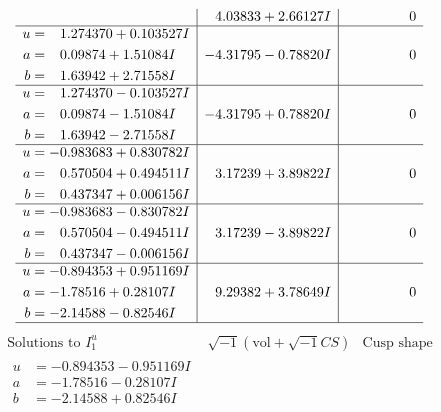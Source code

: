 \documentclass[1p]{elsarticle_modified}
\theoremstyle{definition}
\newcommand{\I}{\sqrt{-1}}
\begin{document}
$$\begin{array}{c|c|c}
 & \phantom{-}4.03833 + 2.66127 I & \phantom{-0.000000 } 0 \\ \hline\begin{aligned}
u &= \phantom{-}1.274370 + 0.103527 I \\
a &= \phantom{-}0.09874 + 1.51084 I \\
b &= \phantom{-}1.63942 + 2.71558 I\end{aligned}
 & -4.31795 - 0.78820 I & \phantom{-0.000000 } 0 \\ \hline\begin{aligned}
u &= \phantom{-}1.274370 - 0.103527 I \\
a &= \phantom{-}0.09874 - 1.51084 I \\
b &= \phantom{-}1.63942 - 2.71558 I\end{aligned}
 & -4.31795 + 0.78820 I & \phantom{-0.000000 } 0 \\ \hline\begin{aligned}
u &= -0.983683 + 0.830782 I \\
a &= \phantom{-}0.570504 + 0.494511 I \\
b &= \phantom{-}0.437347 + 0.006156 I\end{aligned}
 & \phantom{-}3.17239 + 3.89822 I & \phantom{-0.000000 } 0 \\ \hline\begin{aligned}
u &= -0.983683 - 0.830782 I \\
a &= \phantom{-}0.570504 - 0.494511 I \\
b &= \phantom{-}0.437347 - 0.006156 I\end{aligned}
 & \phantom{-}3.17239 - 3.89822 I & \phantom{-0.000000 } 0 \\ \hline\begin{aligned}
u &= -0.894353 + 0.951169 I \\
a &= -1.78516 + 0.28107 I \\
b &= -2.14588 - 0.82546 I\end{aligned}
 & \phantom{-}9.29382 + 3.78649 I & \phantom{-0.000000 } 0\\
 \hline 
 \end{array}$$\newpage$$\begin{array}{c|c|c}  
\text{Solutions to }I^u_{1}& \I (\text{vol} + \sqrt{-1}CS) & \text{Cusp shape}\\
 \hline 
\begin{aligned}
u &= -0.894353 - 0.951169 I \\
a &= -1.78516 - 0.28107 I \\
b &= -2.14588 + 0.82546 I\end{aligned}

\end{array}$$
\end{document}
